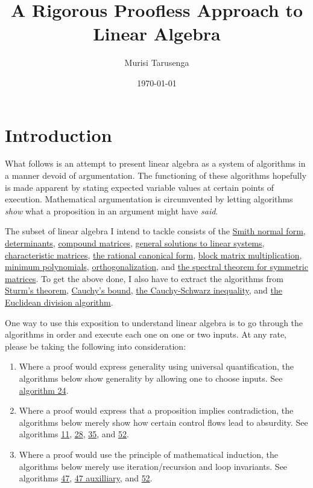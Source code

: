 \documentclass[twocolumn]{article}
\begin{document}
	\title{A Rigorous Proofless Approach to Linear Algebra}
	\author{Murisi Tarusenga}
	\date{\today{} \currenttime}
	\maketitle
	\section{Introduction}
		What follows is an attempt to present linear algebra as a system of algorithms in a manner devoid of argumentation. The functioning of these algorithms hopefully is made apparent by stating expected variable values at certain points of execution. Mathematical argumentation is circumvented by letting algorithms \textit{show} what a proposition in an argument might have \textit{said}.
		
		The subset of linear algebra I intend to tackle consists of the \hyperref[sec:algorithm 3]{Smith normal form}, \hyperref[sec:algorithm 8]{determinants}, \hyperref[sec:algorithm 13]{compound matrices}, \hyperref[sec:algorithm 24]{general solutions to linear systems}, \hyperref[sec:algorithm 26]{characteristic matrices}, \hyperref[sec:algorithm 29]{the rational canonical form}, \hyperref[sec:algorithm 31]{block matrix multiplication}, \hyperref[sec:algorithm 32]{minimum polynomials}, \hyperref[sec:algorithm 50]{orthogonalization}, and \hyperref[sec:algorithm 55]{the spectral theorem for symmetric matrices}. To get the above done, I also have to extract the algorithms from \hyperref[sec:algorithm 42]{Sturm's theorem}, \hyperref[sec:algorithm 40]{Cauchy's bound}, \hyperref[sec:algorithm 51]{the Cauchy-Schwarz inequality}, and \hyperref[sec:algorithm 46]{the Euclidean division algorithm}.
		
		One way to use this exposition to understand linear algebra is to go through the algorithms in order and execute each one on one or two inputs. At any rate, please be taking the following into consideration:
		\begin{enumerate}
			\item Where a proof would express generality using universal quantification, the algorithms below show generality by allowing one to choose inputs. See \hyperref[sec:algorithm 24]{algorithm 24}.
			\item Where a proof would express that a proposition implies contradiction, the algorithms below merely show how certain control flows lead to absurdity. See algorithms \hyperref[sec:algorithm 11]{11}, \hyperref[sec:algorithm 28]{28}, \hyperref[sec:algorithm 35]{35}, and \hyperref[sec:algorithm 52]{52}.
			\item Where a proof would use the principle of mathematical induction, the algorithms below merely use iteration/recursion and loop invariants. See algorithms \hyperref[sec:algorithm 47]{47}, \hyperref[sec:algorithm 47]{47 auxilliary}, and \hyperref[sec:algorithm 52]{52}.
		\end{enumerate}
		
\end{document}
